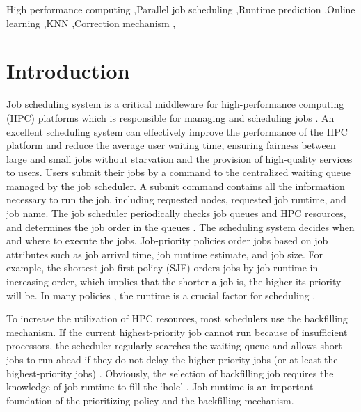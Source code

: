 \documentclass[a4paper,fleqn]{cas-sc}
\begin{document}
\begin{keywords}
High performance computing \sep Parallel job scheduling \sep Runtime prediction \sep Online learning \sep KNN \sep Correction mechanism \sep
\end{keywords}


\maketitle


\section{Introduction}

Job scheduling system is a critical middleware for high-performance computing (HPC) platforms which is responsible for managing and scheduling jobs \cite{1onlinetune}. An excellent scheduling system can effectively improve the performance of the HPC platform and reduce the average user waiting time, ensuring fairness between large and small jobs without starvation  and the provision of high-quality services to users. Users submit their jobs by a command to the centralized waiting queue managed by the job scheduler. A submit command contains all the information necessary to run the job, including requested nodes, requested job runtime, and job name. The job scheduler periodically checks job queues and HPC resources, and determines the job order in the queues \cite{3Cluster17}. The scheduling system decides when and where to execute the jobs. Job-priority policies order jobs based on job attributes such as job arrival time, job runtime estimate, and job size. For example, the shortest job first policy (SJF) orders jobs by job runtime in increasing order, which implies that the shorter a job is, the higher its priority will be. In many policies \cite{4SC17, 5Cluster09}, the runtime is a crucial factor for scheduling \cite{2SC15}.

To increase the utilization of HPC resources, most schedulers use the backfilling mechanism. If the current highest-priority job cannot run because of insufficient processors, the scheduler regularly searches the waiting queue and allows short jobs to run ahead if they do not delay the higher-priority jobs (or at least the highest-priority jobs) \cite{6Tsafrir, 7Sim}. Obviously, the selection of backfilling job requires the knowledge of job runtime to fill the `hole' \cite{8Model}. Job runtime is an important foundation of the prioritizing policy and the backfilling mechanism.
\end{document}
